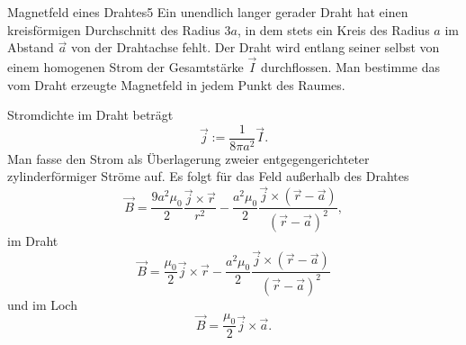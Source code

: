 \begin{problem}{Magnetfeld eines Drahtes}{5}
Ein unendlich langer gerader Draht hat einen kreisförmigen Durchschnitt des Radius $3a$, in dem stets ein Kreis des Radius $a$ im Abstand $\vec a$ von der Drahtachse fehlt. Der Draht wird entlang seiner selbst von einem homogenen Strom der Gesamtstärke $\vec I$ durchflossen. Man bestimme das vom Draht erzeugte Magnetfeld in jedem Punkt des Raumes.
\begin{solution}
Stromdichte im Draht beträgt
\[
\vec{j}:=\frac{1}{8\pi a^2}\vec{I}.
\]
Man fasse den Strom als Überlagerung zweier entgegengerichteter zylinderförmiger Ströme auf. Es folgt für das Feld außerhalb des Drahtes
\[
\vec{B}=\frac{9 a^2 \mu_0}{2} \frac{\vec{j}\times\vec{r}}{r^2}-\frac{a^2 \mu_0}{2}\frac{\vec{j} \times (\vec{r}-\vec{a})}{(\vec{r}-\vec{a})^2},
\]
im Draht
\[
\vec{B}=\frac{\mu_0}{2} \vec{j}\times\vec{r}-\frac{a^2 \mu_0}{2}\frac{\vec{j} \times (\vec{r}-\vec{a})}{(\vec{r}-\vec{a})^2}
\]
und im Loch
\[
\vec{B}=\frac{\mu_0}{2} \vec{j}\times\vec{a}.
\]
\end{solution}
\end{problem}


